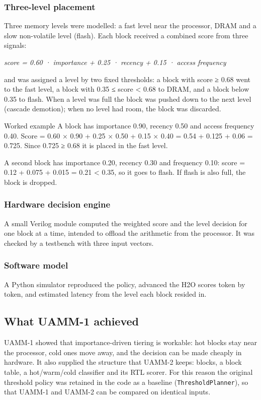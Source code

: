 \documentclass[12pt,a4paper]{report}
\begin{document}
\subsubsection{Three-level placement}\label{sec:3_1_3}
Three memory levels were modelled: a fast level near the processor, DRAM and a slow non-volatile level (flash). Each block received a combined score from three signals:

\begin{center}\small\textit{score = 0.60 · importance + 0.25 · recency + 0.15 · access frequency}\end{center}
and was assigned a level by two fixed thresholds: a block with score ≥ 0.68 went to the fast level, a block with 0.35 ≤ score < 0.68 to DRAM, and a block below 0.35 to flash. When a level was full the block was pushed down to the next level (cascade demotion); when no level had room, the block was discarded.

\begin{calloutbox}{Worked example}
A block has importance 0.90, recency 0.50 and access frequency 0.40. Score = 0.60 × 0.90 + 0.25 × 0.50 + 0.15 × 0.40 = 0.54 + 0.125 + 0.06 = 0.725. Since 0.725 ≥ 0.68 it is placed in the fast level.

A second block has importance 0.20, recency 0.30 and frequency 0.10: score = 0.12 + 0.075 + 0.015 = 0.21 < 0.35, so it goes to flash. If flash is also full, the block is dropped.

\end{calloutbox}
\subsubsection{Hardware decision engine}\label{sec:3_1_4}
A small Verilog module computed the weighted score and the level decision for one block at a time, intended to offload the arithmetic from the processor. It was checked by a testbench with three input vectors.

\subsubsection{Software model}\label{sec:3_1_5}
A Python simulator reproduced the policy, advanced the H2O scores token by token, and estimated latency from the level each block resided in.

\subsection{What UAMM-1 achieved}\label{sec:3_2}
UAMM-1 showed that importance-driven tiering is workable: hot blocks stay near the processor, cold ones move away, and the decision can be made cheaply in hardware. It also supplied the structure that UAMM-2 keeps: blocks, a block table, a hot/warm/cold classifier and its RTL scorer. For this reason the original threshold policy was retained in the code as a baseline (\texttt{ThresholdPlanner}), so that UAMM-1 and UAMM-2 can be compared on identical inputs.
\end{document}

